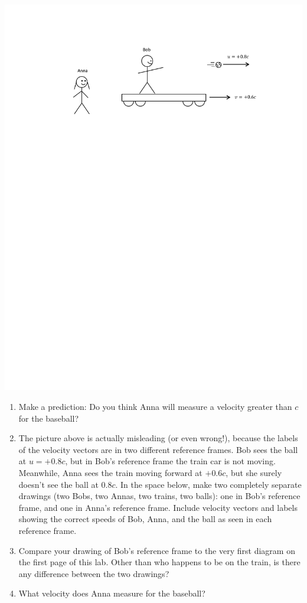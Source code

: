 \begin{center}
\includegraphics{velocity_transformations/baseball2.pdf}
\end{center}

\begin{enumerate}[labparts]
\item Make a prediction: Do you think Anna will measure a velocity greater than $c$ for the baseball?
\answerspace{0.5in}

\item The picture above is actually misleading (or even wrong!), because the labels of the velocity vectors are in two different reference frames.  Bob sees the ball at $u=+0.8c$, but in Bob's reference frame the train car is not moving.  Meanwhile, Anna sees the train moving forward at $+0.6c$, but she surely doesn't see the ball at $0.8c$.  In the space below, make two completely separate drawings (two Bobs, two Annas, two trains, two balls): one in Bob's reference frame, and one in Anna's reference frame.  Include velocity vectors and labels showing the correct speeds of Bob, Anna, and the ball as seen in each reference frame.  
\answerspace{2.5in}

\item Compare your drawing of Bob's reference frame to the very first diagram on the first page of this lab.  Other than who happens to be on the train, is there any difference between the two drawings?
\answerspace{0.5in}

\item What velocity does Anna measure for the baseball?
\answerspace{0.5in}

\end{enumerate}


